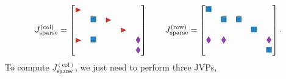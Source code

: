 \begin{equation}
    {J}^{(\text{col})}_{\text{sparse}} = \begin{bmatrix}
        \color{myred}{\blacktriangleright} &                            &                                  &                                  &                              \\
                                         & \color{myblue}{\blacksquare} & \color{myred}{\blacktriangleright} &                                  &                              \\
                                         &                            &                                  & \color{myred}{\blacktriangleright} &                              \\
        \color{myred}{\blacktriangleright} & \color{myblue}{\blacksquare} &                                  &                                  & \color{myviolet}{\blacklozenge} \\
                                         &                            &                                  &                                  & \color{myviolet}{\blacklozenge}
    \end{bmatrix} \qquad {J}^{(\text{row})}_{\text{sparse}} = \begin{bmatrix}
        \color{myblue}{\blacksquare}   &                              &                            &                            &                              \\
                                     & \color{myblue}{\blacksquare}   & \color{myblue}{\blacksquare} &                            &                              \\
                                     &                              &                            & \color{myblue}{\blacksquare} &                              \\
        \color{myviolet}{\blacklozenge} & \color{myviolet}{\blacklozenge} &                            &                            & \color{myviolet}{\blacklozenge} \\
                                     &                              &                            &                            & \color{myblue}{\blacksquare}
    \end{bmatrix}.
\end{equation}
To compute $J^{(\text{col})}_{\text{sparse}}$, we just need to perform three JVPs, 
